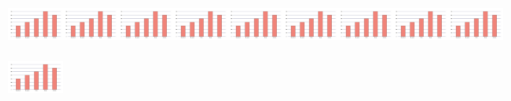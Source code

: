 \begin{escolha}
\begin{escolha}
{{{{\includegraphics[width=0.57293in,height=0.51122in]{media/image122.png}\includegraphics[width=0.57293in,height=0.51122in]{media/image122.png}\includegraphics[width=0.57293in,height=0.51122in]{media/image122.png}\includegraphics[width=0.57293in,height=0.51122in]{media/image122.png}\includegraphics[width=0.57293in,height=0.51122in]{media/image122.png}\includegraphics[width=0.57293in,height=0.51122in]{media/image122.png}\includegraphics[width=0.57293in,height=0.51122in]{media/image122.png}\includegraphics[width=0.57293in,height=0.51122in]{media/image122.png}\includegraphics[width=0.57293in,height=0.51122in]{media/image122.png}\includegraphics[width=0.57293in,height=0.51122in]{media/image122.png}

}}}}
\end{escolha}
\end{escolha}
